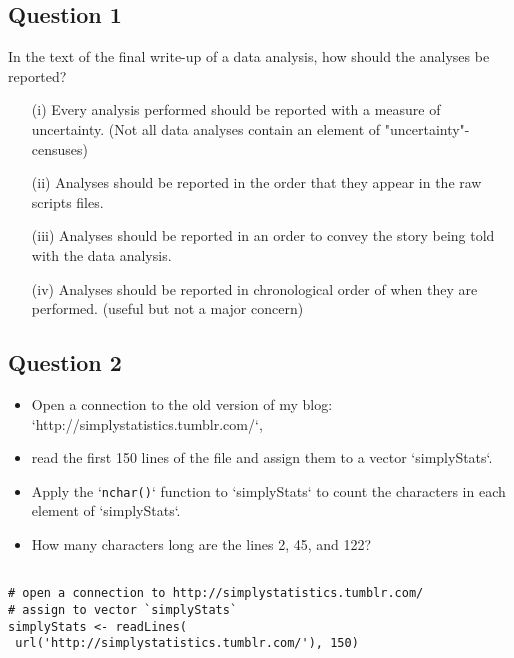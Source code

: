 \documentclass[]{article}
\begin{document}

\subsection*{Question 1}

In the text of the final write-up of a data analysis, how should the analyses be reported?

\begin{itemize} 
\item[(i)] Every analysis performed should be reported with a measure of uncertainty. (Not all data analyses contain an element of "uncertainty"- censuses)
\item[(ii)] Analyses should be reported in the order that they appear in the raw scripts files.
\item[(iii)] Analyses should be reported in an order to convey the story being told with the data analysis.
\item[(iv)] Analyses should be reported in chronological order of when they are performed. (useful but not a major concern)
\end{itemize}


\newpage
\subsection*{Question 2}

\begin{itemize}
\item Open a connection to the old version of my blog: `http://simplystatistics.tumblr.com/`, 
\item read the first 150 lines of the file and assign them to a vector `simplyStats`. 
\item Apply the `\texttt{nchar()}` function to `simplyStats` to count the characters in each element of `simplyStats`. 
\item How many characters long are the lines 2, 45, and 122?
\end{itemize}


\begin{framed}
\begin{verbatim}

# open a connection to http://simplystatistics.tumblr.com/ 
# assign to vector `simplyStats`
simplyStats <- readLines( 
 url('http://simplystatistics.tumblr.com/'), 150)
\end{verbatim}
\end{framed}
\end{document}
